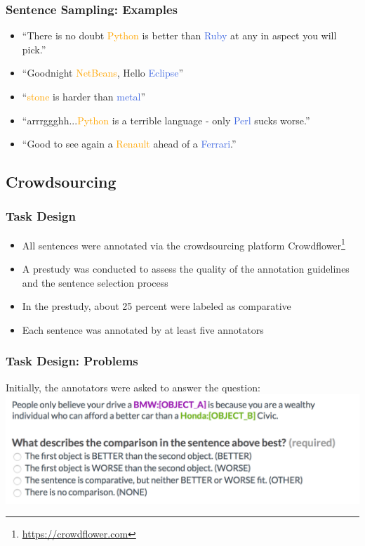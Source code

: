 \documentclass[11pt,aspectratio=169,usenames,dvipsnames]{beamer}
\begin{document}
    \begin{frame}[t]
        \frametitle{Sentence Sampling: Examples}
        \begin{itemize}
            \item \enquote{There is no doubt \textcolor{orange}{Python} is better than \textcolor{RoyalBlue}{Ruby} at any in aspect you will pick.}
            \item \enquote{Goodnight \textcolor{orange}{NetBeans}, Hello \textcolor{RoyalBlue}{Eclipse}}
            \item \enquote{\textcolor{orange}{stone} is harder than \textcolor{RoyalBlue}{metal}}
            \item \enquote{arrrggghh...\textcolor{orange}{Python} is a terrible language - only \textcolor{RoyalBlue}{Perl} sucks worse.}
            \item \enquote{Good to see again a \textcolor{orange}{Renault} ahead of a \textcolor{RoyalBlue}{Ferrari}.}
        \end{itemize}
    \end{frame}

    \subsection{Crowdsourcing}
    \frame{\subsectionpage}
    \begin{frame}[t]
        \frametitle{Task Design}
        \begin{itemize}
            \item All sentences were annotated via the crowdsourcing platform Crowdflower\footnote{\url{https://crowdflower.com}}
            \item A prestudy was conducted to assess the quality of the annotation guidelines and the sentence selection process
            \item In the prestudy, about 25 percent were labeled as comparative
            \item Each sentence was annotated by at least five annotators
        \end{itemize}

    \end{frame}

    \begin{frame}[t]
        \frametitle{Task Design: Problems}
        Initially, the annotators were asked to answer the question:
        \includegraphics[scale=0.3]{images/q1other}
    \end{frame}
\end{document}

